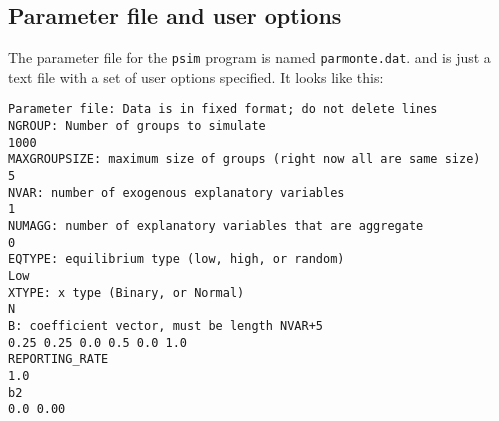 \documentclass{article}
\begin{document}
\subsection{Parameter file and user options}

The parameter file for the {\tt psim} program is named {\tt parmonte.dat}.
and is just a text file with a set of user options specified.  It looks like this:
{\tiny \begin{verbatim}
Parameter file: Data is in fixed format; do not delete lines
NGROUP: Number of groups to simulate
1000
MAXGROUPSIZE: maximum size of groups (right now all are same size)
5
NVAR: number of exogenous explanatory variables
1
NUMAGG: number of explanatory variables that are aggregate
0
EQTYPE: equilibrium type (low, high, or random)
Low
XTYPE: x type (Binary, or Normal)
N
B: coefficient vector, must be length NVAR+5
0.25 0.25 0.0 0.5 0.0 1.0
REPORTING_RATE
1.0
b2
0.0 0.00
\end{verbatim}}
\end{document}
